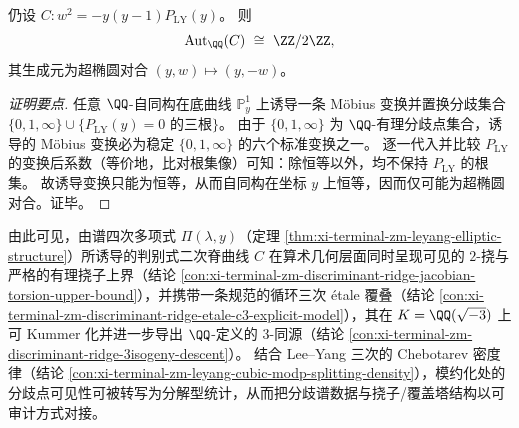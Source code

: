 \begin{conclusion}\label{con:xi-terminal-zm-discriminant-ridge-autq-rigidity}
仍设 \(C:w^{2}=-y(y-1)P_{\mathrm{LY}}(y)\)。
则
\[
\mathrm{Aut}_{\QQ}(C)\ \cong\ \ZZ/2\ZZ,
\]
其生成元为超椭圆对合 \((y,w)\mapsto (y,-w)\)。
\end{conclusion}
\begin{proof}[证明要点]
任意 \(\QQ\)-自同构在底曲线 \(\mathbb{P}^{1}_{y}\) 上诱导一条 Möbius 变换并置换分歧集合
\(
\{0,1,\infty\}\cup\{P_{\mathrm{LY}}(y)=0\text{ 的三根}\}
\)。
由于 \(\{0,1,\infty\}\) 为 \(\QQ\)-有理分歧点集合，诱导的 Möbius 变换必为稳定 \(\{0,1,\infty\}\) 的六个标准变换之一。
逐一代入并比较 \(P_{\mathrm{LY}}\) 的变换后系数（等价地，比对根集像）可知：除恒等以外，均不保持 \(P_{\mathrm{LY}}\) 的根集。
故诱导变换只能为恒等，从而自同构在坐标 \(y\) 上恒等，因而仅可能为超椭圆对合。证毕。
\end{proof}

由此可见，由谱四次多项式 \(\Pi(\lambda,y)\)（定理 \ref{thm:xi-terminal-zm-leyang-elliptic-structure}）所诱导的判别式二次脊曲线 \(C\) 在算术几何层面同时呈现可见的 \(2\)-挠与严格的有理挠子上界（结论 \ref{con:xi-terminal-zm-discriminant-ridge-jacobian-torsion-upper-bound}），并携带一条规范的循环三次 \'etale 覆叠（结论 \ref{con:xi-terminal-zm-discriminant-ridge-etale-c3-explicit-model}），其在 \(K=\QQ(\sqrt{-3})\) 上可 Kummer 化并进一步导出 \(\QQ\)-定义的 \(3\)-同源（结论 \ref{con:xi-terminal-zm-discriminant-ridge-3isogeny-descent}）。
结合 Lee--Yang 三次的 Chebotarev 密度律（结论 \ref{con:xi-terminal-zm-leyang-cubic-modp-splitting-density}），模约化处的分歧点可见性可被转写为分解型统计，从而把分歧谱数据与挠子/覆盖塔结构以可审计方式对接。

